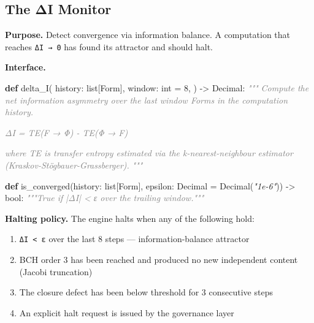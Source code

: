 \documentclass[11pt,a4paper]{article}
\newenvironment{Shaded}{\begin{snugshade}\small}{\end{snugshade}}
\newcommand{\KeywordTok}[1]{\textbf{#1}}
\newcommand{\DecValTok}[1]{#1}
\newcommand{\StringTok}[1]{\textit{#1}}
\newcommand{\CommentTok}[1]{\textit{\textcolor{gray}{#1}}}
\newcommand{\OperatorTok}[1]{#1}
\newcommand{\BuiltInTok}[1]{#1}
\newcommand{\NormalTok}[1]{#1}
\providecommand{\tightlist}{\setlength{\itemsep}{0pt}\setlength{\parskip}{0pt}}
\begin{document}
\hypertarget{the-ux3b4i-monitor}{%
\subsection{The ΔI Monitor}\label{the-ux3b4i-monitor}}

\textbf{Purpose.} Detect convergence via information balance. A
computation that reaches \texttt{ΔI\ →\ 0} has found its attractor and
should halt.

\textbf{Interface.}

\begin{Shaded}
\begin{Highlighting}[]
\KeywordTok{def}\NormalTok{ delta\_I(}
\NormalTok{    history: }\BuiltInTok{list}\NormalTok{[Form],}
\NormalTok{    window: }\BuiltInTok{int} \OperatorTok{=} \DecValTok{8}\NormalTok{,}
\NormalTok{) }\OperatorTok{{-}\textgreater{}}\NormalTok{ Decimal:}
    \CommentTok{"""}
\CommentTok{    Compute the net information asymmetry over the last \textasciigrave{}window\textasciigrave{} Forms}
\CommentTok{    in the computation history.}

\CommentTok{    ΔI = TE(F → Φ) {-} TE(Φ → F)}

\CommentTok{    where TE is transfer entropy estimated via the k{-}nearest{-}neighbour}
\CommentTok{    estimator (Kraskov{-}Stögbauer{-}Grassberger).}
\CommentTok{    """}

\KeywordTok{def}\NormalTok{ is\_converged(history: }\BuiltInTok{list}\NormalTok{[Form], epsilon: Decimal }\OperatorTok{=}\NormalTok{ Decimal(}\StringTok{"1e{-}6"}\NormalTok{)) }\OperatorTok{{-}\textgreater{}} \BuiltInTok{bool}\NormalTok{:}
    \CommentTok{"""True if |ΔI| \textless{} ε over the trailing window."""}
\end{Highlighting}
\end{Shaded}

\textbf{Halting policy.} The engine halts when any of the following
hold:

\begin{enumerate}
\def\labelenumi{\arabic{enumi}.}
\tightlist
\item
  \texttt{\textbar{}ΔI\textbar{}\ \textless{}\ ε} over the last 8 steps
  --- information-balance attractor
\item
  BCH order 3 has been reached and produced no new independent content
  (Jacobi truncation)
\item
  The closure defect has been below threshold for 3 consecutive steps
\item
  An explicit halt request is issued by the governance layer
\end{enumerate}
\end{document}
